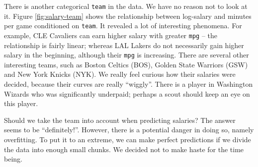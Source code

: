 \documentclass[english]{article}
\begin{document}
There is another categorical \texttt{team} in the data. We have no
reason not to look at it. Figure \ref{fig:salary-team} shows the
relationship between log-salary and minutes per game conditioned on
\texttt{team}. It revealed a lot of interesting phenomena. For example,
CLE Cavaliers can earn higher salary with greater \texttt{mpg} --
the relationship is fairly linear; whereas LAL Lakers do not necessarily
gain higher salary in the beginning, although their \texttt{mpg} is
increasing. There are several other interesting teams, such as Boston
Celtics (BOS), Golden State Warriors (GSW) and New York Knicks (NYK).
We really feel curious how their salaries were decided, because their
curves are really {}``wiggly''. There is a player in Washington
Wizards who was significantly underpaid; perhaps a scout should keep
an eye on this player.

Should we take the team into account when predicting salaries? The
answer seems to be {}``definitely!''. However, there is a potential
danger in doing so, namely overfitting. To put it to an extreme, we
can make perfect predictions if we divide the data into enough small
chunks. We decided not to make haste for the time being.
\end{document}
